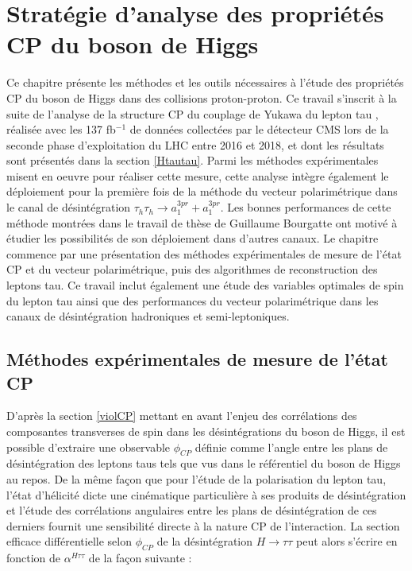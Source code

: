 \chapter{Stratégie d'analyse des propriétés CP du boson de Higgs}
\label{chap6}

Ce chapitre présente les méthodes et les outils nécessaires à l'étude des propriétés CP du boson de Higgs dans des collisions proton-proton. Ce travail s'inscrit à la suite de l'analyse de la structure CP du couplage de Yukawa du lepton tau \cite{Htautau}, réalisée avec les 137 fb$^{-1}$ de données collectées par le détecteur CMS lors de la seconde phase d'exploitation du LHC entre 2016 et 2018, et dont les résultats sont présentés dans la section \ref{Htautau}. Parmi les méthodes expérimentales misent en oeuvre pour réaliser cette mesure, cette analyse intègre également le déploiement pour la première fois de la méthode du vecteur polarimétrique dans le canal de désintégration $\tau_h\tau_h\rightarrow a_1^{3pr}+a_1^{3pr}$. Les bonnes performances de cette méthode montrées dans le travail de thèse de Guillaume Bourgatte \cite{guigui} ont motivé à étudier les possibilités de son déploiement dans d'autres canaux. Le chapitre commence par une présentation des méthodes expérimentales de mesure de l'état CP et du vecteur polarimétrique, puis des algorithmes de reconstruction des leptons tau. Ce travail inclut également une étude des variables optimales de spin du lepton tau ainsi que des performances du vecteur polarimétrique dans les canaux de désintégration hadroniques et semi-leptoniques.

\section{Méthodes expérimentales de mesure de l'état CP}
\label{CPmethods}

D'après la section \ref{violCP} mettant en avant l'enjeu des corrélations des composantes transverses de spin dans les désintégrations du boson de Higgs, il est possible d'extraire une observable $\phi_{CP}$ définie comme l'angle entre les plans de désintégration des leptons taus tels que vus dans le référentiel du boson de Higgs au repos. De la même façon que pour l'étude de la polarisation du lepton tau, l'état d'hélicité dicte une cinématique particulière à ses produits de désintégration et l'étude des corrélations angulaires entre les plans de désintégration de ces derniers fournit une sensibilité directe à la nature CP de l'interaction. La section efficace différentielle selon $\phi_{CP}$ de la désintégration $H\rightarrow \tau\tau$ peut alors s'écrire en fonction de $\alpha^{H\tau\tau}$ de la façon suivante :

